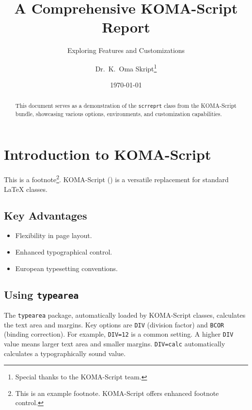 \documentclass[
    a4paper,            %
    11pt,               %
    DIV=12,             %
    BCOR=5mm,           %
    twoside,            %
    headings=normal,    %
    toc=bibliography,   %
    toc=listof,         %
    listof=totoc,       %
    parskip=half,       %
    captions=tableheading, %
    numbers=autoendperiod, %
    appendixprefix=true,%
    chapterprefix=true, %
]{scrreprt}
\title{A Comprehensive KOMA-Script Report}
\subtitle{Exploring Features and Customizations}
\author{Dr.\ K.\ Oma Skript\thanks{Special thanks to the KOMA-Script team.}}
\date{\today}
\begin{document}
\maketitle

\begin{abstract}
  \lipsum[1] %
  This document serves as a demonstration of the \texttt{scrreprt} class from the KOMA-Script bundle, showcasing various options, environments, and customization capabilities.
\end{abstract}
\clearpage %

\tableofcontents
\listoftables
\lstlistoflistings%
\clearpage

\setcounter{page}{1}  %

\chapter{Introduction to KOMA-Script}
\lipsum[2-3]
This is a  footnote\footnote{This is an example footnote. KOMA-Script offers enhanced footnote control.}.
KOMA-Script (\KOMAScript) is a versatile replacement for standard LaTeX classes.

\section{Key Advantages}
\lipsum[4]
\begin{itemize}
  \item Flexibility in page layout.
  \item Enhanced typographical control.
  \item European typesetting conventions.
\end{itemize}

\section{Using \texttt{typearea}}
The \texttt{typearea} package, automatically loaded by KOMA-Script classes, calculates the text area and margins.
Key options are \texttt{DIV} (division factor) and \texttt{BCOR} (binding correction).
For example, \texttt{DIV=12} is a common setting. A higher \texttt{DIV} value means larger text area and smaller margins.
\texttt{DIV=calc} automatically calculates a typographically sound value.
\lipsum[5]
\end{document}
